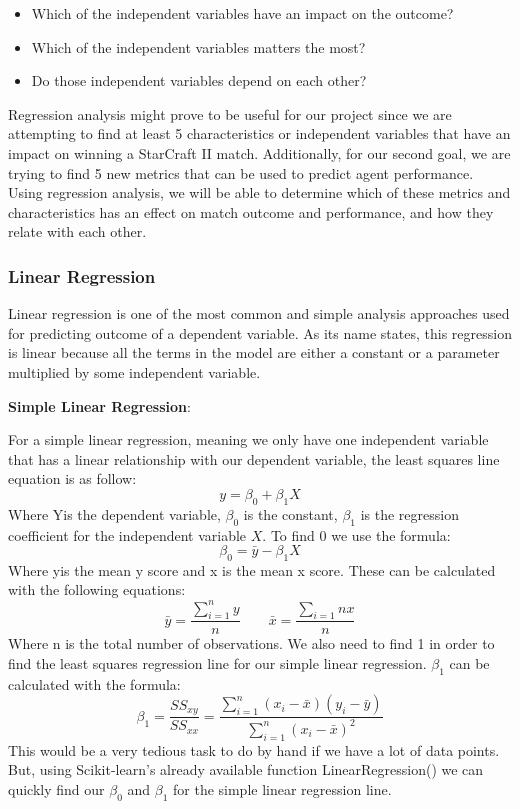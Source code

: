 \documentclass[a4paper,12pt]{report}
\newcommand{\msection}[1]{\noindent\textbf{#1}}
\begin{document}
\begin{itemize}[,]
    \setlength\itemsep{-.1cm}
    \item Which of the independent variables have an impact on the outcome?
    \item Which of the independent variables matters the most?
    \item Do those independent variables depend on each other?
\end{itemize}

Regression analysis might prove to be useful for our project since we are attempting to find at least 5 characteristics or independent variables that have an impact on winning a StarCraft II match. Additionally, for our second goal, we are trying to find 5 new metrics that can be used to predict agent performance. Using regression analysis, we will be able to determine which of these metrics and characteristics has an effect on match outcome and performance, and how they relate with each other.

\subsubsection{Linear Regression}

Linear regression is one of the most common and simple analysis approaches used for predicting outcome of a dependent variable. As its name states, this regression is linear because all the terms in the model are either a constant or a parameter multiplied by some independent variable.
 
\msection{Simple Linear Regression}:

For a simple linear regression, meaning we only have one independent variable that has a linear relationship with our dependent variable, the least squares line equation is as follow:
$$y=\beta_0+\beta_1X$$
Where Yis the dependent variable, $\beta_0$ is the constant, $\beta_1$ is the regression coefficient for the independent variable $X$.
To find 0 we use the formula:
$$\beta_0=\bar{y}-\beta_1X$$
Where yis the mean y score and x is the mean x score. These can be calculated with the following equations:
$$\bar{y}=\frac{\sum_{i=1}^ny}{n}\qquad\bar{x}=\frac{\sum_{i=1}nx}{n}$$
Where n is the total number of observations. We also need to find 1 in order to find the least squares regression line for our simple linear regression. $\beta_1$ can be calculated with the formula:
$$\beta_1=\frac{SS_{xy}}{SS_{xx}}=\frac{\sum_{i=1}^n(x_i-\bar{x})(y_i-\bar{y})}{\sum_{i=1}^n(x_i-\bar{x})^2}$$
This would be a very tedious task to do by hand if we have a lot of data points. But, using Scikit-learn’s already available function LinearRegression() we can quickly find our $\beta_0$ and $\beta_1$ for the simple linear regression line.
\end{document}
